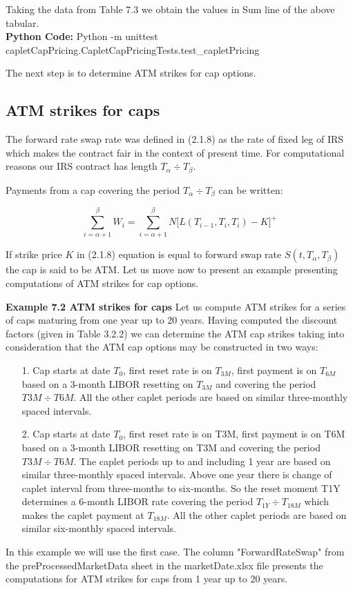 \documentclass[11pt]{article}
\numberwithin{equation}{subsection}
\begin{document}
Taking the data from Table 7.3 we obtain the values in Sum line of the above tabular.\\
\textbf{Python Code:} Python -m unittest capletCapPricing.CapletCapPricingTests.test\_capletPricing

The next step is to determine ATM strikes for cap options.

\subsection{ATM strikes for caps}

The forward rate swap rate was defined in (2.1.8) as the rate of fixed leg of IRS which makes the contract
fair in the context of present time. For computational reasons our IRS contract has length
\(T_{\alpha} \div T_{\beta}\).

Payments from a cap covering the period \(T_{\alpha} \div T_{\beta}\) can be written: 

\begin{equation*}
\sum_{i=\alpha + 1}^{\beta} W_i = \sum_{i=\alpha + 1}^{\beta} N \big[ L(T_{i-1}, T_{i}, T_i) -K\big]^{+}
\end{equation*}

If strike price \(K\) in (2.1.8) equation is equal to forward swap rate \(S(t, T_{\alpha}, T_{\beta})\) the cap is
said to be ATM. Let us move now to present an example presenting computations of ATM
strikes for cap options.


\textbf{Example 7.2 ATM strikes for caps}
Let us compute ATM strikes for a series of caps maturing from one year up to 20 years. Having computed the discount factors (given in Table 3.2.2) we can determine the ATM cap strikes taking into consideration that the ATM cap options may be constructed in two ways:

\begin{enumerate}
	\item [1.] Cap starts at date \(T_0\), first reset rate is on \(T_{3M}\), first payment is on \(T_{6M}\) based on a 3-month
	LIBOR resetting on \(T_{3M}\) and covering the period \(T3M \div T6M\). All the other caplet periods are based on similar three-monthly spaced intervals.
	\item [2.] Cap starts at date \(T_0\), first reset rate is on T3M, first payment is on T6M based on a 3-month LIBOR resetting on T3M and covering the period \(T3M \div T6M\). The caplet periods up to and including 1 year are based on similar three-monthly spaced intervals. Above one year there is change of caplet interval from three-months to six-months. So the reset moment T1Y determines a 6-month LIBOR rate covering the period \(T_{1Y} \div T_{18M}\) which makes the caplet payment at \(T_{18M}\). All the other caplet periods are based on similar six-monthly spaced intervals.
\end{enumerate}
In this example we will use the first case.
The column "ForwardRateSwap" from the preProcessedMarketData sheet in the marketDate.xlsx file presents the computations for ATM strikes for caps from 1 year up to 20 years.
\end{document}
